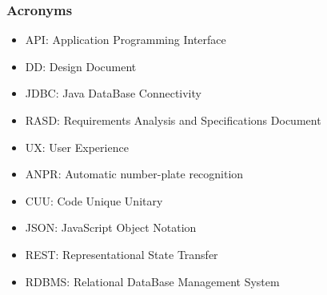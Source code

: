 \subsubsection{Acronyms}
\begin{itemize}
	\item
	API: Application Programming Interface
	\item
	DD: Design Document
	\item
	JDBC: Java DataBase Connectivity
	\item
	RASD: Requirements Analysis and Specifications Document
	\item
	UX: User Experience
	\item
	ANPR: Automatic number-plate recognition
	\item
	CUU: Code Unique Unitary
	\item 
	JSON: JavaScript Object Notation
	\item
	REST: Representational State Transfer
	\item 
	RDBMS: Relational DataBase Management System
\end{itemize}